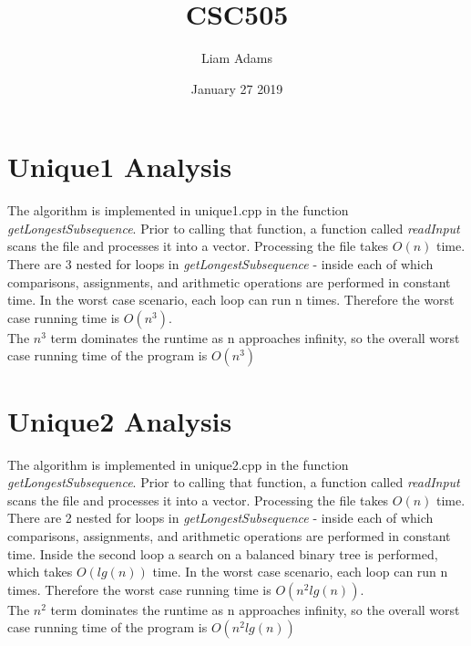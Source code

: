 \documentclass{article}
\title{CSC505}
\author{Liam Adams}
\date{January 27 2019}
\begin{document}
\maketitle

\section{Unique1 Analysis}
The algorithm is implemented in unique1.cpp in the function \textit{getLongestSubsequence}. Prior to calling that function, a function called \textit{readInput} scans the file and processes it into a vector.  Processing the file takes $O(n)$ time.\\
There are 3 nested for loops in \textit{getLongestSubsequence} - inside each of which comparisons, assignments, and arithmetic operations are performed in constant time.  In the worst case scenario, each loop can run n times.  Therefore the worst case running time is $O(n^3)$.\\
The $n^3$ term dominates the runtime as n approaches infinity, so the overall worst case running time of the program is $O(n^3)$\\

\section{Unique2 Analysis}
The algorithm is implemented in unique2.cpp in the function \textit{getLongestSubsequence}. Prior to calling that function, a function called \textit{readInput} scans the file and processes it into a vector.  Processing the file takes $O(n)$ time.\\
There are 2 nested for loops in \textit{getLongestSubsequence} - inside each of which comparisons, assignments, and arithmetic operations are performed in constant time.  Inside the second loop a search on a balanced binary tree is performed, which takes $O(lg(n))$ time.  In the worst case scenario, each loop can run n times.  Therefore the worst case running time is $O(n^2lg(n))$.\\
The $n^2$ term dominates the runtime as n approaches infinity, so the overall worst case running time of the program is $O(n^2lg(n))$
\end{document}
